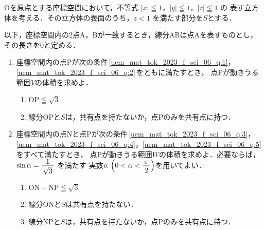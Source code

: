 ﻿\documentclass[../../../uem_mat_tok_q.tex]{subfiles}
\begin{document}
    Oを原点とする座標空間において，不等式 $|x|\leqq 1$，$|y|\leqq 1$，$|z|\leqq 1$ の%
    表す立方体を考える．その立方体の表面のうち，$z<1$ を満たす部分を$S$とする．

    以下，座標空間内の2点A，Bが一致するとき，線分ABは点Aを表すものとし，%
    その長さを0と定める．

    \begin{enumerate}
        \item 座標空間内の点Pが次の条件\,\ref{uem_mat_tok_2023_f_sci_06_q:1}，%
            \ref{uem_mat_tok_2023_f_sci_06_q:2}\,をともに満たすとき，%
            点Pが動きうる範囲$V$の体積を求めよ．
            \begin{enumerate}
                \item $\mathrm{OP}\leqq\sqrt{3}$
                    \label{uem_mat_tok_2023_f_sci_06_q:1}
                \item 線分OPと$S$は，共有点を持たないか，点Pのみを共有点に持つ．
                    \label{uem_mat_tok_2023_f_sci_06_q:2}
            \end{enumerate}
        \item 座標空間内の点Nと点Pが次の条件\,\ref{uem_mat_tok_2023_f_sci_06_q:3}，%
            \ref{uem_mat_tok_2023_f_sci_06_q:4}，\ref{uem_mat_tok_2023_f_sci_06_q:5}\,をすべて満たすとき，%
            点Pが動きうる範囲$W$の体積を求めよ．必要ならば，%
            $\sin\alpha=\myfraca{1}{\sqrt{3}}$ を満たす%
            実数$\alpha\,\left(0<\alpha<\myfraca{\pi}{2}\right)$を用いてよい．
            \begin{enumerate}[resume]
                \item $\mathrm{ON}+\mathrm{NP}\leqq\sqrt{3}$
                    \label{uem_mat_tok_2023_f_sci_06_q:3}
                \item 線分ONと$S$は共有点を持たない．
                    \label{uem_mat_tok_2023_f_sci_06_q:4}
                \item 線分NPと$S$は，共有点を持たないか，点Pのみを共有点に持つ．
                    \label{uem_mat_tok_2023_f_sci_06_q:5}
            \end{enumerate}
    \end{enumerate}
\end{document}
